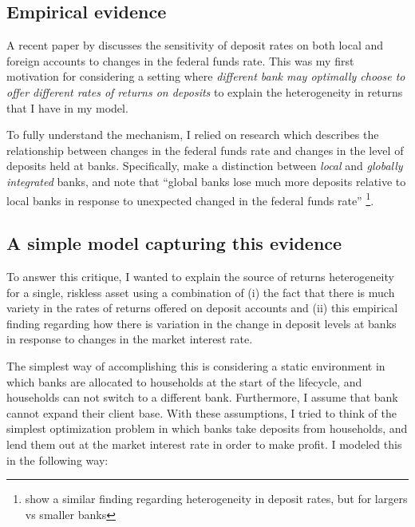 \documentclass{article}
\newcommand{\say}[1]{``#1''}
\begin{document}
\subsection{Empirical evidence}

\par A recent paper by \cite{Ahmed2025} discusses the sensitivity of deposit rates on both local and foreign accounts to changes in the federal funds rate. This was my first motivation for considering a setting where \textit{different bank may optimally choose to offer different rates of returns on deposits} to explain the heterogeneity in returns that I have in my model.

\par To fully understand the mechanism, I relied on research which describes the relationship between changes in the federal funds rate and changes in the level of deposits held at banks. Specifically, \cite{Sarkisyan2021} make a distinction between \textit{local} and \textit{globally integrated} banks, and note that \say{global banks lose much more deposits relative to local banks in response to unexpected changed in the federal funds rate} \footnote{ \cite{d'Avernas2024} show a similar finding regarding heterogeneity in deposit rates, but for largers vs smaller banks}.

\subsection{A simple model capturing this evidence}

\par To answer this critique, I wanted to explain the source of returns heterogeneity for a single, riskless asset using a combination of (i) the fact that there is much variety in the rates of returns offered on deposit accounts and (ii) this empirical finding regarding how there is variation in the change in deposit levels at banks in response to changes in the market interest rate.

\par The simplest way of accomplishing this is considering a static environment in which banks are allocated to households at the start of the lifecycle, and households can not switch to a different bank. Furthermore, I assume that bank cannot expand their client base. With these assumptions, I tried to think of the simplest optimization problem in which banks take deposits from households, and lend them out at the market interest rate in order to make profit. I modeled this in the following way:
\end{document}
